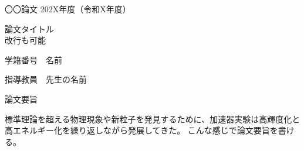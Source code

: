 \begin{center}
  {\Large 〇〇論文 202X年度（令和X年度）}

  {\LARGE 論文タイトル\\改行も可能}
\end{center}

\quad

\begin{flushright}
    学籍番号　名前

    指導教員　先生の名前
\end{flushright}

\quad

{\large \gt 論文要旨}

  標準理論を超える物理現象や新粒子を発見するために、加速器実験は高輝度化と高エネルギー化を繰り返しながら発展してきた。
  こんな感じで論文要旨を書ける。


